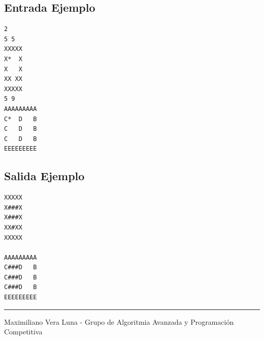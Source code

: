 \documentclass[letter,10pt]{article}
\newcommand{\lyxaddress}[1]{
\par {\raggedright #1
\vspace{1.4em}
\noindent\par}
}
\begin{document}
\subsection*{Entrada Ejemplo}
\begin{verbatim}
2
5 5
XXXXX
X*  X
X   X
XX XX
XXXXX
5 9
AAAAAAAAA
C*  D   B
C   D   B
C   D   B
EEEEEEEEE
\end{verbatim}

\subsection*{Salida Ejemplo}

\begin{verbatim}
XXXXX
X###X
X###X
XX#XX
XXXXX

AAAAAAAAA
C###D   B
C###D   B
C###D   B
EEEEEEEEE

\end{verbatim}

\noindent \rule[0.5ex]{1\columnwidth}{1pt}


\lyxaddress{Maximiliano Vera Luna - Grupo de Algoritmia Avanzada y Programación Competitiva}
\end{document}

